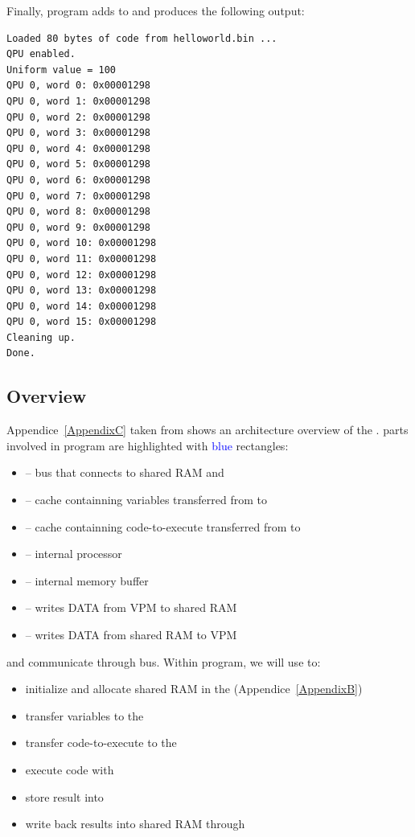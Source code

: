 Finally, program adds  to  and produces the following output:

\begin{lstlisting}
Loaded 80 bytes of code from helloworld.bin ...
QPU enabled.
Uniform value = 100
QPU 0, word 0: 0x00001298
QPU 0, word 1: 0x00001298
QPU 0, word 2: 0x00001298
QPU 0, word 3: 0x00001298
QPU 0, word 4: 0x00001298
QPU 0, word 5: 0x00001298
QPU 0, word 6: 0x00001298
QPU 0, word 7: 0x00001298
QPU 0, word 8: 0x00001298
QPU 0, word 9: 0x00001298
QPU 0, word 10: 0x00001298
QPU 0, word 11: 0x00001298
QPU 0, word 12: 0x00001298
QPU 0, word 13: 0x00001298
QPU 0, word 14: 0x00001298
QPU 0, word 15: 0x00001298
Cleaning up.
Done.
\end{lstlisting}


\subsection{\vc{} Overview}



Appendice~\ref{AppendixC} taken from \parencite{refVC} shows an architecture overview of the \vc.  parts involved in  program are highlighted with \textcolor{blue}{blue} rectangles:




\begin{itemize}
	\item {} -- bus that connects \vc{} to shared RAM and \cpu
	\item {} -- cache containning variables transferred from \cpu{} to \vc
	\item {} -- cache containning code-to-execute transferred from \cpu{} to \vc
	\item {} -- \vc{} internal processor
	\item {} -- \vc{} internal memory buffer
	\item {} -- writes DATA from VPM to shared RAM
	\item {} -- writes DATA from shared RAM to VPM
\end{itemize}
\vspace{5 mm}

\cpu{} and \vc{} communicate through  bus. Within  program, we will use \cpu{} to:
\begin{itemize}
	\item initialize and allocate shared RAM in the  (Appendice~\ref{AppendixB})
	\item transfer variables to the 
	\item transfer code-to-execute to the 
	\item execute code with 
	\item store result into 
	\item write back results into shared RAM through 
\end{itemize}


